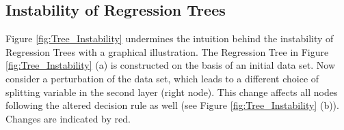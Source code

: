 \subsection{Instability of Regression Trees}
\label{sec:instability}



\noindent
Figure \ref{fig:Tree_Instability} undermines the intuition behind the instability of Regression Trees with a graphical illustration. The Regression Tree in Figure \ref{fig:Tree_Instability} (a) is constructed on the basis of an initial data set. Now consider a perturbation of the data set, which leads to a different choice of splitting variable in the second layer (right node). This change affects all nodes following the altered decision rule as well (see Figure \ref{fig:Tree_Instability} (b)). Changes are indicated by red.


